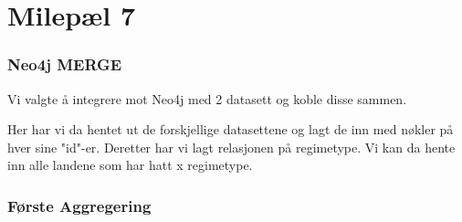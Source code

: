 \section{Milepæl 7}

\subsubsection{Neo4j MERGE}
Vi valgte å integrere mot Neo4j med 2 datasett og koble disse sammen.

Her har vi da hentet ut de forskjellige datasettene og lagt de inn med nøkler på hver sine "id"-er. Deretter har vi lagt relasjonen på regimetype. Vi kan da hente inn alle landene som har hatt x regimetype.

\subsubsection{Første Aggregering}
